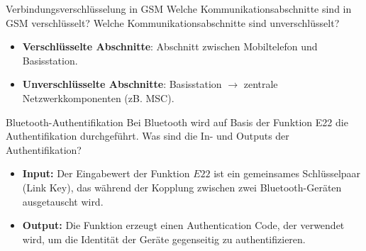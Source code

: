 \documentclass{article}
\begin{document}
\setcounter{subsection}{228}
\begin{exercise}{Verbindungsverschlüsselung in GSM}\label{ex:gsm}
  Welche Kommunikationsabschnitte sind in GSM verschlüsselt? Welche Kommunikationsabschnitte sind unverschlüsselt?

  \begin{solution}
    \begin{itemize}
        \item \textbf{Verschlüsselte Abschnitte}: Abschnitt zwischen Mobiltelefon und Basisstation.
        \item \textbf{Unverschlüsselte Abschnitte}: Basisstation $\to$ zentrale Netzwerkkomponenten (zB. MSC).
    \end{itemize}
  \end{solution}
\end{exercise}

\setcounter{subsection}{2226}
\begin{exercise}{Bluetooth-Authentifikation}
  Bei Bluetooth wird auf Basis der Funktion E22 die Authentifikation durchgeführt. Was sind die In- und Outputs der Authentifikation?

  \begin{solution}
    \begin{itemize}
        \item \textbf{Input:} Der Eingabewert der Funktion $ E22 $ ist ein gemeinsames Schlüsselpaar (Link Key), das während der Kopplung zwischen zwei Bluetooth-Geräten ausgetauscht wird.
        \item \textbf{Output:} Die Funktion erzeugt einen Authentication Code, der verwendet wird, um die Identität der Geräte gegenseitig zu authentifizieren.
    \end{itemize}
  \end{solution}
\end{exercise}
\end{document}
